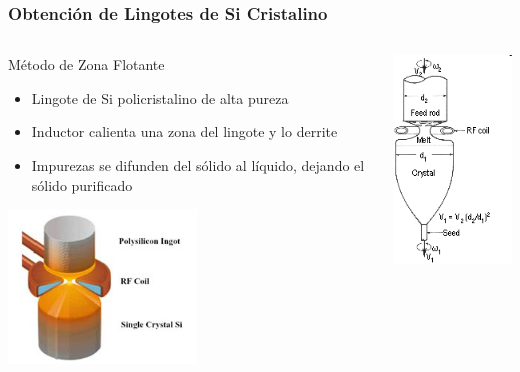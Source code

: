 \documentclass[aspectratio=169,10pt]{beamer}
\begin{document}
\begin{frame}
\frametitle{Obtención de Lingotes de Si Cristalino}

\begin{columns}
	\begin{column}{0.5\textwidth}
		Método de Zona Flotante
		
		\begin{itemize}
			\item Lingote de Si policristalino de alta pureza
			\item Inductor calienta una zona del lingote y lo derrite
			\item Impurezas se difunden del sólido al líquido, dejando el sólido purificado
		\end{itemize}
	
	\centering
	\includegraphics[width=5cm]{floating1}
	\end{column}
	\begin{column}{0.5\textwidth}
		\centering
		\includegraphics[width=4cm]{floating2}
	\end{column}
\end{columns}
\end{frame}
\end{document}
